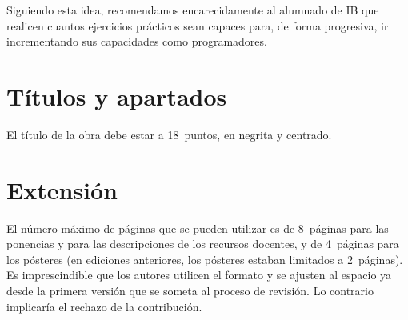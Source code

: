 \documentclass[twocolumn,twoside,a4paper, 10pt]{article}
\begin{document}
Siguiendo esta idea, recomendamos encarecidamente al alumnado de IB que realicen cuantos ejercicios prácticos
sean capaces para, de forma progresiva, ir incrementando sus capacidades como programadores.

\section{Títulos y apartados}

El título de la obra debe estar a 18~puntos, en negrita y centrado.

\section{Extensión}

El número máximo de páginas que se pueden utilizar es de 8~páginas para las ponencias 
y para las descripciones de los recursos docentes, y de 4~páginas para los pósteres 
(en ediciones anteriores, los pósteres estaban limitados a 2~páginas). 
Es imprescindible que los autores utilicen el formato y se ajusten al espacio ya 
desde la primera versión que se someta al proceso de revisión. Lo contrario implicaría 
el rechazo de la contribución.
\end{document}
